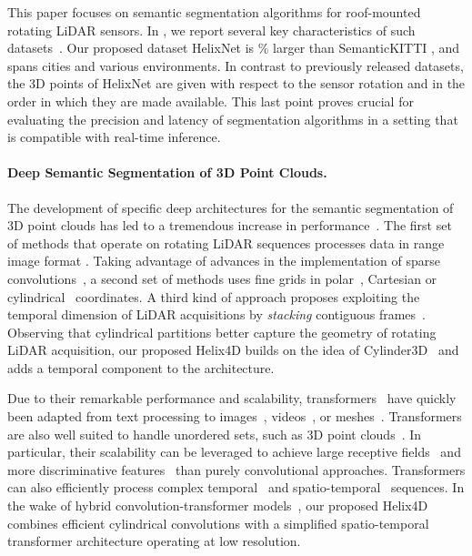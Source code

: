 \documentclass[runningheads]{tpls/llncs}
\begin{document}
This paper focuses on semantic segmentation algorithms for roof-mounted rotating LiDAR sensors. In , we report several key characteristics of such datasets~\cite{jiang2021rellis,Geiger2013IJRR,behley2019iccv,Liao2021ARXIV,geyer2020a2d2,roynard2017parislille3d,tan2020toronto}.
Our proposed dataset HelixNet is \% larger than SemanticKITTI \cite{Geiger2013IJRR,behley2019iccv}, and spans  cities and various environments.
In contrast to previously released datasets, the 3D points of HelixNet are given with respect to the sensor rotation and in the order in which they are made available. This last point proves crucial for evaluating the precision and latency of segmentation algorithms in a setting that is compatible with real-time inference.

\paragraph{Deep Semantic Segmentation of 3D Point Clouds.}
The development of specific deep architectures for the semantic segmentation of 3D point clouds has led to a tremendous increase in performance~\cite{guo2020deep}. 
The first set of methods that operate on rotating LiDAR sequences processes data in range image format \cite{Liang_2021_CVPR,Sun_2021_CVPR,cortinhal2020salsanext}.
Taking advantage of advances in the implementation of sparse convolutions~\cite{SubmanifoldSparseConvNet,choy20194d}, a second set of methods uses fine grids in polar~\cite{Zhang_2020_CVPR}, Cartesian \cite{tang2020searching,cheng20212} or cylindrical~\cite{zhu2021cylindrical,Hong_2021_CVPR} coordinates. A third kind of approach proposes exploiting the temporal dimension of LiDAR acquisitions by \emph{stacking} contiguous frames~\cite{choy20194d,aygun20214d}. Observing that cylindrical partitions better capture the geometry of rotating LiDAR acquisition, our proposed Helix4D builds on the idea of Cylinder3D~\cite{zhu2021cylindrical} and adds a temporal component to the architecture.

Due to their remarkable performance and scalability, transformers~\cite{NIPS2017_3f5ee243} have quickly been adapted from text processing to images~\cite{dosovitskiy2020image,Liu_2021_ICCV,Strudel_2021_ICCV,carion2020end}, videos~\cite{Arnab_2021_ICCV}, or meshes~\cite{lin2021end}. Transformers are also well suited to handle unordered sets, such as 3D point clouds~\cite{guo2021pct,zhao2021point}. In particular, their scalability can be leveraged to achieve large receptive fields~\cite{Mao_2021_ICCV,pan20213d} and more discriminative features~\cite{bhattacharyya2021self} than purely convolutional approaches. Transformers can also efficiently process complex temporal~\cite{katharopoulos_et_al_2020,vyas_et_al_2020} and spatio-temporal~\cite{fan2021point} sequences. In the wake of hybrid convolution-transformer models~\cite{guo2021cmt,coccomini2021combining,d2021convit}, our proposed Helix4D combines efficient cylindrical convolutions with a simplified spatio-temporal transformer architecture operating at low resolution.
\end{document}
